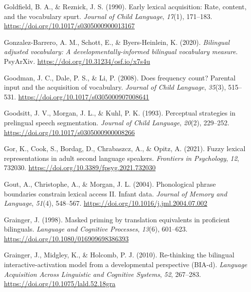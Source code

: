 \documentclass[
  12pt,
  b5paperpaper,
  twoside]{scrreprt}
\newlength{\cslhangindent}
\newlength{\cslentryspacingunit} %
\newenvironment{CSLReferences}[2] %
 {%
  \setlength{\parindent}{0pt}
  \ifodd #1
  \let\oldpar\par
  \def\par{\hangindent=\cslhangindent\oldpar}
  \fi
  \setlength{\parskip}{#2\cslentryspacingunit}
 }%
 {}
\begin{document}
\begin{CSLReferences}{1}{0}
\leavevmode{}%
Goldfield, B. A., \& Reznick, J. S. (1990). Early lexical acquisition:
Rate, content, and the vocabulary spurt. \emph{Journal of Child
Language}, \emph{17}(1), 171--183.
\url{https://doi.org/10.1017/s0305000900013167}

\leavevmode{}%
Gonzalez-Barrero, A. M., Schott, E., \& Byers-Heinlein, K. (2020).
\emph{Bilingual adjusted vocabulary: A developmentally-informed
bilingual vocabulary measure}. {PsyArXiv}.
\url{https://doi.org/10.31234/osf.io/x7s4u}

\leavevmode{}%
Goodman, J. C., Dale, P. S., \& Li, P. (2008). Does frequency count?
{Parental} input and the acquisition of vocabulary. \emph{Journal of
Child Language}, \emph{35}(3), 515--531.
\url{https://doi.org/10.1017/s0305000907008641}

\leavevmode{}%
Goodsitt, J. V., Morgan, J. L., \& Kuhl, P. K. (1993). Perceptual
strategies in prelingual speech segmentation. \emph{Journal of Child
Language}, \emph{20}(2), 229--252.
\url{https://doi.org/10.1017/s0305000900008266}

\leavevmode{}%
Gor, K., Cook, S., Bordag, D., Chrabaszcz, A., \& Opitz, A. (2021).
Fuzzy lexical representations in adult second language speakers.
\emph{Frontiers in Psychology}, \emph{12}, 732030.
\url{https://doi.org/10.3389/fpsyg.2021.732030}

\leavevmode{}%
Gout, A., Christophe, A., \& Morgan, J. L. (2004). Phonological phrase
boundaries constrain lexical access {II}. Infant data. \emph{Journal of
Memory and Language}, \emph{51}(4), 548--567.
\url{https://doi.org/10.1016/j.jml.2004.07.002}

\leavevmode{}%
Grainger, J. (1998). Masked priming by translation equivalents in
proficient bilinguals. \emph{Language and Cognitive Processes},
\emph{13}(6), 601--623. \url{https://doi.org/10.1080/016909698386393}

\leavevmode{}%
Grainger, J., Midgley, K., \& Holcomb, P. J. (2010). Re-thinking the
bilingual interactive-activation model from a developmental perspective
({BIA-d}). \emph{Language Acquisition Across Linguistic and Cognitive
Systems}, \emph{52}, 267--283.
\url{https://doi.org/10.1075/lald.52.18gra}


\end{CSLReferences}
\end{document}
